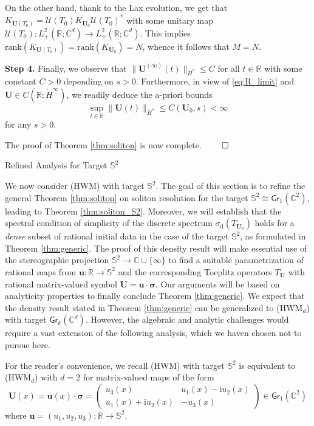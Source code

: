 \documentclass[11pt,reqno]{amsart}
\makeatletter
\theoremstyle{definition}
\theoremstyle{remark}
\theoremstyle{remark}
\numberwithin{equation}{section}
\newcommand{\C}{\mathbb{C}}
\newcommand{\R}{\mathbb{R}}
\newcommand{\UU}{\mathcal{U}}
\newcommand{\Ss}{\mathbb{S}}
\newcommand{\rank}{\mathrm{rank}}
\newcommand{\ii}{\mathrm{i}}
\newcommand{\uu}{\mathbf{u}}
\newcommand{\Ub}{\mathbf{U}}
\newcommand{\Gr}{\mathsf{Gr}}
\def\section{\@startsection{section}{1}%
  \z@{1.5\linespacing\@plus\linespacing}{.5\linespacing}%
  {\normalfont\bfseries\large\centering}}
\makeatother
\begin{document}
On the other hand, thank to the Lax evolution, we get that $K_{\Ub(T_0)}= \UU(T_0) K_{\Ub_0} \UU(T_0)^*$ with some unitary map $\UU(T_0) : L^2_+(\R; \C^d) \to L^2_+(\R; \C^d)$. This implies  $\rank(K_{\Ub(T_0)}) = \rank(K_{\Ub_0}) = N$, whence it follows that $M=N$.

\medskip
\textbf{Step 4.} Finally, we observe that $\| \Ub^{(\infty)}(t) \|_{\dot{H}^s} \leq C$ for all $t \in \R$ with some constant $C>0$ depending on $s>0$. Furthermore, in view of \eqref{eq:R_limit} and $\Ub \in C(\R; \dot{H}^\infty)$, we readily deduce the a-priori bounds
$$
\sup_{t \in \R} \| \Ub(t) \|_{\dot{H}^s} \leq C(\Ub_0,s) < \infty
$$
for any $s >0$.

The proof of Theorem \ref{thm:soliton} is now complete.  \hfill $\qed$

 


\section{Refined Analysis for Target $\Ss^2$}
\label{sec:target_S2}

We now consider (HWM) with target $\Ss^2$. The goal of this section is to refine the general Theorem \ref{thm:soliton} on soliton resolution for the target $\Ss^2 \cong \Gr_1(\C^2)$, leading to Theorem \ref{thm:soliton_S2}. Moreover, we will establish that the spectral condition of simplicity of the discrete spectrum $\sigma_{\mathrm{d}}(T_{\Ub_0})$ holds for a {\em dense} subset of rational initial data in the case of the target $\Ss^2$, as formulated in Theorem \ref{thm:generic}. The proof of this density result will make essential use of the stereographic projection $\Ss^2 \to \C \cup \{ \infty \}$ to find a suitable parametrization of rational maps from $\uu : \R \to \Ss^2$ and the corresponding Toeplitz operators $T_\Ub$ with rational matrix-valued symbol $\Ub = \uu \cdot \bm{\sigma}$. Our arguments will be based on analyticity properties to finally conclude Theorem \ref{thm:generic}. We expect that the density  result stated in Theorem \ref{thm:generic} can be generalized to (HWM$_d$) with target $\Gr_k(\C^d)$. However, the algebraic and analytic challenges would require a vast extension of the following analysis, which we haven chosen not to pursue here.



For the reader's convenience, we recall (HWM) with target $\Ss^2$ is equivalent to (HWM$_d$) with $d=2$ for matrix-valued maps of the form
$$
\Ub(x) = \uu(x) \cdot \bm{\sigma} =  \left ( \begin{array}{cc} u_3(x) & u_1(x) - \ii u_2(x) \\ u_1(x) + \ii u_2(x) & -u_3(x) \end{array} \right ) \in \Gr_1(\C^2) 
$$
where  $\uu = (u_1,u_2,u_3) : \R \to \Ss^2$. 
\end{document}
